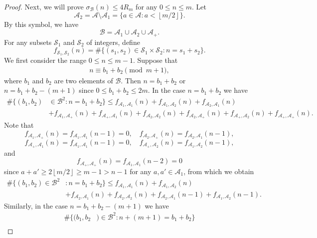 \documentclass[12pt,a4paper,reqno]{amsart}
\numberwithin{equation}{section}
\newcommand{\floor}[1]{\left\lfloor #1\right\rfloor}
\theoremstyle{plain}
\theoremstyle{definition}
\begin{document}
\begin{proof}
Next, we will prove $\sigma_{\mathcal{B}}(n)\le 4R_m$ for any $0\le n\le m$. Let
$$
\mathcal{A}_{2}=\mathcal{A}\setminus\mathcal{A}_1=\big\{a\in \mathcal{A}: a< \floor{m/2}\big\}.
$$
By this symbol, we have
$$
\mathcal{B}=\mathcal{A}_1\cup \mathcal{A}_{2}\cup\mathcal{A}_{+}.
$$
For any subsets $\mathcal{S}_1$ and $\mathcal{S}_2$ of integers, define
$$
f_{\mathcal{S}_1,\mathcal{S}_2}(n)=\#\big\{(s_1,s_2)\in \mathcal{S}_1\times\mathcal{S}_2: n=s_1+s_2\big\}.
$$
We first consider the range $0\le n\le m-1$. Suppose that
\begin{align*}
    n\equiv b_1+b_2\pmod{m+1},
\end{align*}
where $b_1$ and $b_2$ are two elements of $\mathcal{B}$.
Then $n=b_1+b_2$ or $n=b_1+b_2-(m+1)$ since $0\le b_1+b_2\le 2m$. In the case $n=b_1+b_2$ we have
\begin{align*}
    \#\big\{(b_1, b_2)&\in \mathcal{B}^2 :  n=b_1 +b_2\big\}
    \le f_{\mathcal{A}_{1},\mathcal{A}_{1}}(n)+f_{\mathcal{A}_{1},\mathcal{A}_{2}}(n)+f_{\mathcal{A}_{2},\mathcal{A}_{1}}(n)\\
&+f_{\mathcal{A}_{1},\mathcal{A}_{+}}(n)+f_{\mathcal{A}_{+},\mathcal{A}_{1}}(n)+f_{\mathcal{A}_{2},\mathcal{A}_{2}}(n)+f_{\mathcal{A}_{2},\mathcal{A}_{+}}(n)+f_{\mathcal{A}_{+},\mathcal{A}_{2}}(n)+f_{\mathcal{A}_{+},\mathcal{A}_{+}}(n).
\end{align*}
Note that
$$
f_{\mathcal{A}_{1},\mathcal{A}_{+}}(n)=f_{\mathcal{A}_{1},\mathcal{A}_{1}}(n-1)=0,\quad f_{\mathcal{A}_{2},\mathcal{A}_{+}}(n)=f_{\mathcal{A}_{2},\mathcal{A}_{1}}(n-1),
$$
$$
f_{\mathcal{A}_{+},\mathcal{A}_{1}}(n)=f_{\mathcal{A}_{1},\mathcal{A}_{1}}(n-1)=0,\quad f_{\mathcal{A}_{+},\mathcal{A}_{2}}(n)=f_{\mathcal{A}_{1},\mathcal{A}_{2}}(n-1),
$$
and
$$
f_{\mathcal{A}_{+},\mathcal{A}_{+}}(n)=f_{\mathcal{A}_{1},\mathcal{A}_{1}}(n-2)=0
$$
since $a+a'\ge 2\floor{m/2}\ge m-1>n-1$ for any $a, a'\in \mathcal{A}_{1}$,
from which we obtain
\begin{align}\label{eq-proof-1}
    \#\big\{(b_1, b_2)\in \mathcal{B}^2& :  n=b_1 +b_2\big\}
    \le f_{\mathcal{A}_{1},\mathcal{A}_{1}}(n)+f_{\mathcal{A}_{1},\mathcal{A}_{2}}(n)\nonumber\\
    &+f_{\mathcal{A}_{2},\mathcal{A}_{1}}(n)+f_{\mathcal{A}_{2},\mathcal{A}_{2}}(n)+f_{\mathcal{A}_{2},\mathcal{A}_{1}}
    (n-1)+f_{\mathcal{A}_{1},\mathcal{A}_{2}}
    (n-1).
\end{align}
Similarly, in the case $n=b_1+b_2-(m+1)$ we have
\begin{align}\label{eq-proof-2}
    \#\big\{(b_1,b_2&)\in \mathcal{B}^2: n + (m+1)= b_1+b_2\big\}\nonumber\\

\end{align}
\end{proof}
\end{document}
